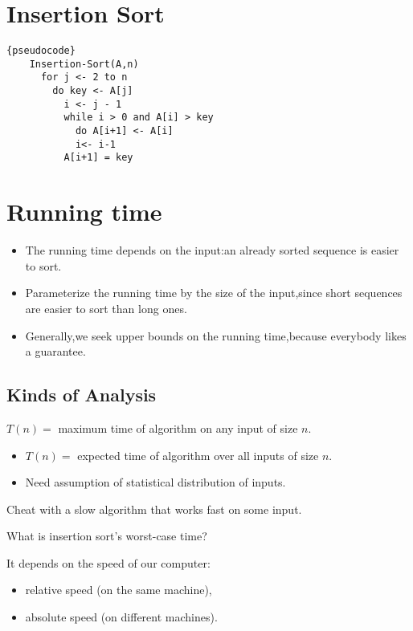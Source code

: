 \documentclass[11pt,toc=twocol]{elegantbook}
\begin{document}
\section{Insertion Sort}
\begin{lstlisting}{pseudocode}
    Insertion-Sort(A,n)
      for j <- 2 to n
        do key <- A[j]
          i <- j - 1
          while i > 0 and A[i] > key
            do A[i+1] <- A[i]
            i<- i-1
          A[i+1] = key
\end{lstlisting}


\section{Running time}

\begin{itemize}
  \item The running time depends on the input:an already sorted sequence is easier to sort.
  \item Parameterize the running time by the size of the input,since short sequences are easier to sort than long ones.
  \item Generally,we seek upper bounds on the running time,because everybody likes a guarantee.
\end{itemize}

\subsection{Kinds of Analysis}



\begin{definition}
  $T(n)=$ maximum time of algorithm on any input of size $n$.
\end{definition}
  
\begin{definition}
  \begin{itemize}
    \item $T(n)=$ expected time of algorithm over all inputs of size $n$.
    \item Need assumption of statistical distribution of inputs.
  \end{itemize}
  
\end{definition}
\begin{definition}
  Cheat with a slow algorithm that works fast on some input.
\end{definition}
\begin{note}
  What is insertion sort’s worst-case time?
\end{note}
It depends on the speed of our computer:
\begin{itemize}
  \item relative speed (on the same machine),
  \item absolute speed (on different machines).
\end{itemize}
\end{document}
